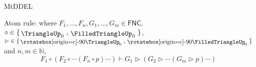 \begin{entry}{MtDDEL}
%
\newcommand{\agand}{\mbox{$\sqcap$}}
\newcommand{\agAND}{\mbox{$\,\,\bigsqcap\,\,$}}
%
\newcommand{\agor}{\mbox{$\sqcup$}}
\newcommand{\agOR}{\mbox{$\,\,\bigsqcup\,\,$}}
%
\def\agra{\mbox{$\,{\aol{\mkern-1.5mu{\rotatebox[origin=c]{-90}{\raisebox{0.12ex}{$\agand$}}}}}\,$}}
\def\agRA{\mbox{$\,\,{\AOL{\mkern-0.4mu{\rotatebox[origin=c]{-90}{\raisebox{0.12ex}{$\agAND$}}}}}\,\,$}}
\def\agla{\mbox{$\,{\rotatebox[origin=c]{180}{$\aol{\mkern-1.6mu{\rotatebox[origin=c]{-90}{\raisebox{0.12ex}{$\agand$}}}}$}}\,$}}
\def\agLA{\mbox{\rotatebox[origin=c]{180}{$\,\,{\AOL{\mkern-0.4mu{\rotatebox[origin=c]{-90}{\raisebox{0.12ex}{$\agAND$}}}}}\,\,$}}}
%
\def\agdra{\mbox{$\,{\rotatebox[origin=c]{-90}{\raisebox{0.12ex}{$\agand$}}{\mkern-1.1mu\aol}}\,$}}
\def\agDRA{\mbox{$\,\,{\rotatebox[origin=c]{-90}{\raisebox{0.12ex}{$\agAND$}}{\mkern-0.7mu\AOL}}\,\,$}}
\def\agdla{\mbox{\rotatebox[origin=c]{180}{$\,{\rotatebox[origin=c]{-90}{\raisebox{0.12ex}{$\agand$}}{\mkern-1.1mu\aol}}\,$}}}
\def\agDLA{\mbox{\rotatebox[origin=c]{180}{$\,\,{\rotatebox[origin=c]{-90}{\raisebox{0.12ex}{$\agAND$}}{\mkern-0.7mu\AOL}}\,\,$}}}
%
\def\agTOP{{_{\textrm{g\!\!}}\textrm{T}}}
\def\agtop{{_{\textrm{g\!\!\!}}\top}}
\def\agBOT{\textrm{\rotatebox[origin=c]{180}{T}}^{\textrm{\!g}}}
\def\agbot{\bot^{\textrm{\!\!g}}}
\def\agneg{\mbox{$\mkern-0.4mu\sim\mkern-0.4mu$}}

\def\aga{\texttt{a}}
\def\agb{\texttt{b}}
\def\agc{\texttt{c}}
\def\agd{\texttt{d}}
\def\agA{{\Large{\texttt{a}}}}
\def\agB{\Large{\texttt{b}}}
\def\agC{\texttt{C}}
\def\agD{\texttt{D}}

\def\bulletaga{{\bullet_{\!\aga}}}
\def\circaga{{\circ_{\!\aga}}}
\def\Wdiaaga{{\Wdia_{\!\aga}}}
\def\Bdiaaga{{\Bdia_{\!\aga}}}
\def\Wboxaga{{\Wbox_{\aga}}}
\def\Bboxaga{{\Bbox_{\aga}}}
%
\def\andol{\rule[-0.4563ex]{1.38ex}{0.1ex}}
\def\aol{\rule[0.5865ex]{1.38ex}{0.1ex}}
\def\AOL{\rule[0.65ex]{1.45ex}{0.1ex}}
\def\orol{\rule[1.4253ex]{1.38ex}{0.1ex}}
%





\begin{calculus}
{
Atom rule: where  $F_1,\ldots, F_n, G_1,\ldots, G_m\in \mathsf{FNC}$, $\circ \in \{\mAND_{\! 0} \ , \mBAND_{\! 0} \ \}$, ${\rhd} \in \{\mRA_{\!\! 0} \ , \mBRA_{\!\! 0} \ \}$ and $n, m\in \mathbb{N}$,
\[
F_1 \circ (F_2 \circ \cdots (F_n \circ p) \cdots)\vdash G_1 {\rhd} (G_2 {\rhd} \cdots (G_m {\rhd} p)\cdots)
\]

}
\end{calculus}
\end{entry}
